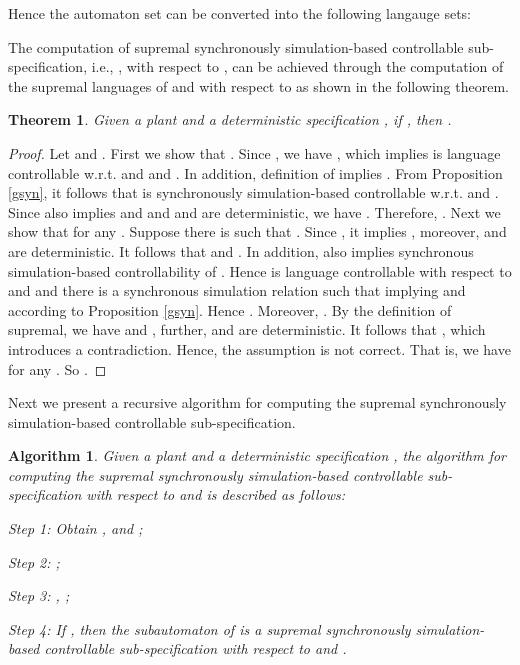 \documentclass[preprint,authoryear,12pt]{elsarticle}
\newtheorem{Theorem}{Theorem}
\newtheorem{Algorithm}{Algorithm}
\begin{document}
Hence the automaton set  can be converted into the following
langauge sets:


The computation of supremal synchronously simulation-based
controllable sub-specification, i.e., , with respect to
, can be achieved through the computation of the
supremal languages of  and  with respect to
 as shown in the following theorem.



\begin{Theorem}\label{supeq}
Given a plant  and a deterministic specification , if
, then  .
\end{Theorem}
\begin{proof}
Let  and . First we show that
. Since , we have , which implies  is language controllable w.r.t.
 and  and . In
addition, definition of  implies . From Proposition \ref{gsyn}, it follows that
 is synchronously simulation-based controllable
w.r.t.  and . Since  also implies
 and  and  and
 are deterministic, we have . Therefore, . Next we show
that  for any . Suppose
there is  such that . Since , it implies ,
moreover,  and  are deterministic. It follows that  and . In
addition,  also implies synchronous
simulation-based controllability of . Hence  is
language controllable with respect to  and  and
there is a synchronous simulation relation  such that  implying 
and  according to
Proposition \ref{gsyn}. Hence . Moreover,
. By the definition of supremal,
we have  and , further,  and 
are deterministic. It follows that ,
which introduces a contradiction. Hence, the assumption is not
correct. That is, we have  for any
. So .

\end{proof}


Next we present a recursive algorithm for computing the supremal
synchronously simulation-based controllable sub-specification.

\begin{Algorithm}\label{alg2}
Given a plant  and a deterministic specification , the
algorithm for computing the supremal synchronously
simulation-based controllable sub-specification with respect to
 and  is described as follows:

Step 1: Obtain ,  and  ;

Step 2: ;

Step 3: , ;

Step 4: If , then the subautomaton
 of  is a supremal synchronously
simulation-based controllable sub-specification with respect to
 and .
\end{Algorithm}
\end{document}
